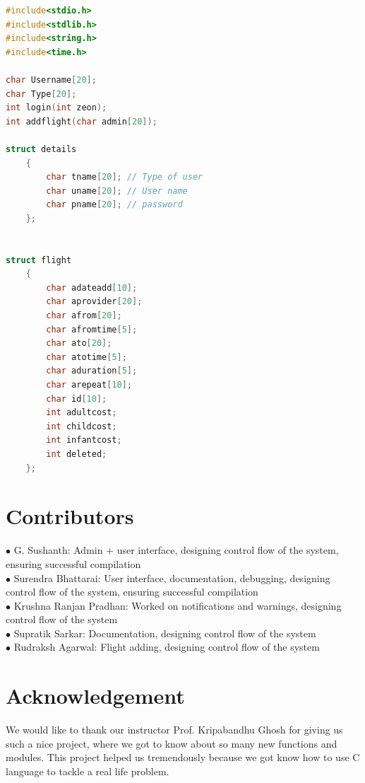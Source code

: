 \documentclass[12pt]{article}
\begin{document}
\begin{lstlisting}[language=C]
#include<stdio.h>
#include<stdlib.h>
#include<string.h>
#include<time.h>

char Username[20];
char Type[20];
int login(int zeon);
int addflight(char admin[20]);

struct details
    {
        char tname[20]; // Type of user
        char uname[20]; // User name
        char pname[20]; // password
    };


struct flight
    {
        char adateadd[10];
        char aprovider[20];
        char afrom[20];
        char afromtime[5];
        char ato[20];
        char atotime[5];
        char aduration[5];
        char arepeat[10];
        char id[10];
        int adultcost;
        int childcost;
        int infantcost;
        int deleted;
    };
\end{lstlisting}


\section{Contributors}
$\bullet$ G. Sushanth: Admin + user interface, designing control flow of the system, ensuring successful compilation\\

\noindent $\bullet$ Surendra Bhattarai: User interface, documentation, debugging, designing control flow of the system, ensuring successful compilation\\

\noindent $\bullet$ Krushna Ranjan Pradhan: Worked on notifications and warnings, designing control flow of the system\\

\noindent $\bullet$ Supratik Sarkar: Documentation, designing control flow of the system\\

\noindent $\bullet$ Rudraksh Agarwal: Flight adding, designing control flow of the system

\section{Acknowledgement}
We would like to thank our instructor Prof. Kripabandhu Ghosh for giving us such a nice project, where we got to know about so many new functions and modules. This project helped us tremendously because we got know how to use C language to tackle a real life problem.
\end{document}
